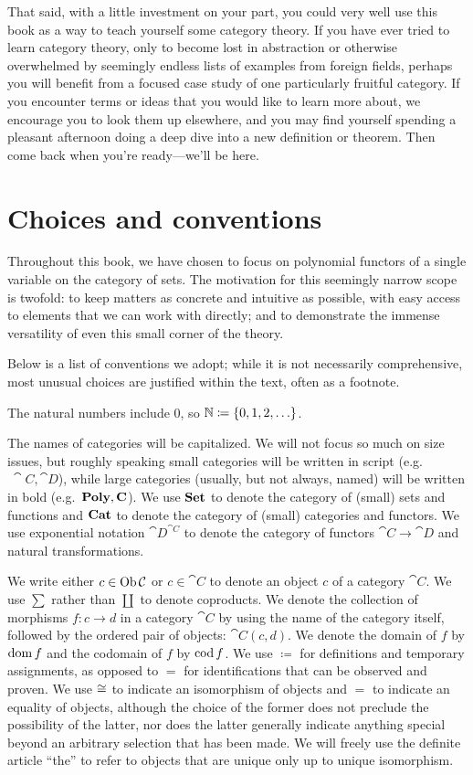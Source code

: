 \documentclass[Book-Poly]{subfiles}
\begin{document}
That said, with a little investment on your part, you could very well use this book as a way to teach yourself some category theory.
If you have ever tried to learn category theory, only to become lost in abstraction or otherwise overwhelmed by seemingly endless lists of examples from foreign fields, perhaps you will benefit from a focused case study of one particularly fruitful category.
If you encounter terms or ideas that you would like to learn more about, we encourage you to look them up elsewhere, and you may find yourself spending a pleasant afternoon doing a deep dive into a new definition or theorem.
Then come back when you're ready---we'll be here.

\section*{Choices and conventions}

Throughout this book, we have chosen to focus on polynomial functors of a single variable on the category of sets.
The motivation for this seemingly narrow scope is twofold: to keep matters as concrete and intuitive as possible, with easy access to elements that we can work with directly; and to demonstrate the immense versatility of even this small corner of the theory.

Below is a list of conventions we adopt; while it is not necessarily comprehensive, most unusual choices are justified within the text, often as a footnote.

The natural numbers include $0$, so $\mathbb{N}\coloneqq\{0,1,2,\ldots\}$.

The names of categories will be capitalized.
We will not focus so much on size issues, but roughly speaking small categories will be written in script (e.g.$\ \cat{C}, \cat{D}$), while large categories (usually, but not always, named) will be written in bold (e.g.\ $\mathbf{Poly}, \mathbf{C}$).
We use $\mathbf{Set}$ to denote the category of (small) sets and functions and $\mathbf{Cat}$ to denote the category of (small) categories and functors.
We use exponential notation $\cat{D}^{\cat{C}}$ to denote the category of functors $\cat{C}\to\cat{D}$ and natural transformations.

We write either $c\in\operatorname{Ob}\mathcal{C}$ or $c\in\cat{C}$ to denote an object $c$ of a category $\cat{C}$.
We use $\sum$ rather than $\coprod$ to denote coproducts.
We denote the collection of morphisms $f\colon c\to d$ in a category $\cat{C}$ by using the name of the category itself, followed by the ordered pair of objects: $\cat{C}(c,d)$.
We denote the domain of $f$ by $\operatorname{dom} f$ and the codomain of $f$ by $\operatorname{cod} f$.
We use $\coloneqq$ for definitions and temporary assignments, as opposed to $=$ for identifications that can be observed and proven.
We use $\cong$ to indicate an isomorphism of objects and $=$ to indicate an equality of objects, although the choice of the former does not preclude the possibility of the latter, nor does the latter generally indicate anything special beyond an arbitrary selection that has been made.
We will freely use the definite article ``the'' to refer to objects that are unique only up to unique isomorphism.
\end{document}

